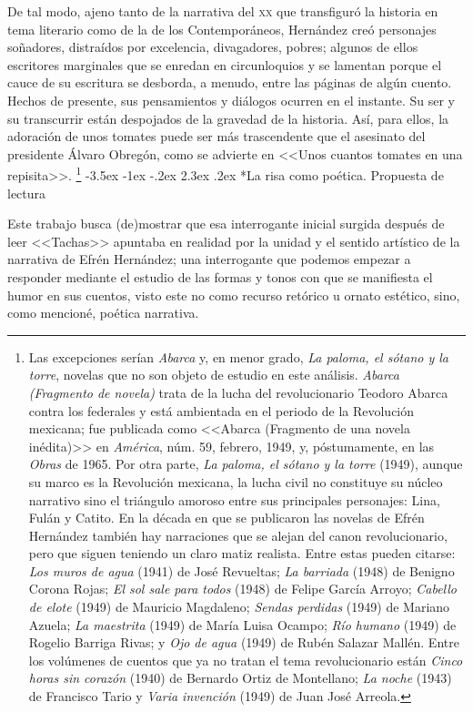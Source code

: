 \documentclass[14pt,twoside,final]{extbook} %
\makeatletter
\let\oldfootnote\footnote
\renewcommand\footnote[1]{%
\oldfootnote{\hspace{1mm}#1}}
\renewcommand\section{\@startsection {section}{1}{\z@}%
                                     {-3.5ex \@plus -1ex \@minus -.2ex}%
                                     {2.3ex \@plus .2ex}%
                                     {\normalfont\large\bfseries\sc}}
\makeatother
\begin{document}
De tal modo, ajeno tanto de la narrativa del \textsc{xx} que transfiguró la historia en tema literario como de la de los Contemporáneos, Hernández creó personajes soñadores, distraídos por excelencia, divagadores, pobres; algunos de ellos escritores marginales que se enredan en circunloquios y se lamentan porque el cauce de su escritura se desborda, a menudo, entre las páginas de algún cuento. Hechos de presente, sus pensamientos y diálogos ocurren en el instante. Su ser y su transcurrir están despojados de la gravedad de la historia. Así, para ellos, la adoración de unos tomates puede ser más trascendente que el asesinato del presidente Álvaro Obregón, como se advierte en <<Unos cuantos tomates en una repisita>>.\footnote{Las excepciones serían \emph{Abarca} y, en menor grado, \emph{La paloma, el sótano y la torre}, novelas que no son objeto de estudio en este análisis. \emph{Abarca (Fragmento de novela)} trata de la lucha del revolucionario Teodoro Abarca contra los federales y está ambientada en el periodo de la Revolución mexicana; fue publicada como <<Abarca (Fragmento de una novela inédita)>> en \emph{América}, núm. 59, febrero, 1949, y, póstumamente, en las \emph{Obras} de 1965. Por otra parte, \emph{La paloma, el sótano y la torre} (1949), aunque su marco es la Revolución mexicana, la lucha civil no constituye su núcleo narrativo sino el triángulo amoroso entre sus principales personajes: Lina, Fulán y Catito. En la década en que se publicaron las novelas de Efrén Hernández también hay narraciones que se alejan del canon revolucionario, pero que siguen teniendo un claro matiz realista. Entre estas pueden citarse: \emph{Los muros de agua} (1941) de José Revueltas; \emph{La barriada} (1948) de Benigno Corona Rojas; \emph{El sol sale para todos} (1948) de Felipe García Arroyo; \emph{Cabello de elote} (1949) de Mauricio Magdaleno; \emph{Sendas perdidas} (1949) de Mariano Azuela; \emph{La maestrita} (1949) de María Luisa Ocampo; \emph{Río humano} (1949) de Rogelio Barriga Rivas; y \emph{Ojo de agua} (1949) de Rubén Salazar Mallén. Entre los volúmenes de cuentos que ya no tratan el tema revolucionario están \emph{Cinco horas sin corazón} (1940) de Bernardo Ortiz de Montellano; \emph{La noche} (1943) de Francisco Tario y \emph{Varia invención} (1949) de Juan José Arreola.}
\section*{La risa como poética. Propuesta de lectura}\label{sec:la-risa-como-poetica-propuesta-de-lectura}
Este trabajo busca (de)mostrar que esa interrogante inicial surgida después de leer <<Tachas>> apuntaba en realidad por la unidad y el sentido artístico de la narrativa de Efrén Hernández; una interrogante que podemos empezar a responder mediante el estudio de las formas y tonos con que se manifiesta el humor en sus cuentos, visto este no como recurso retórico u ornato estético, sino, como mencioné, poética narrativa.
\end{document}
